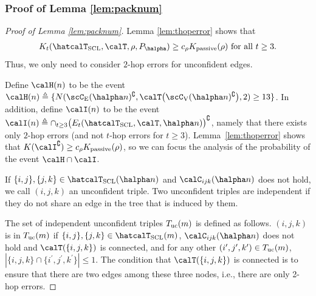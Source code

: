 \documentclass[11pt,onecolumn]{article}
\newcommand{\Passive}{{\rm passive}}
\begin{document}
\subsubsection{Proof of Lemma \ref{lem:packnum}}
\begin{proof}[Proof of Lemma \ref{lem:packnum}]
    Lemma \ref{lem:thoperror} shows that 
    \begin{align}
    	K _{t}(\hatcalT_{{\rm SCL}},\calT,\rho,P_{\halpha})\geq c_{\rho}K _{\Passive}(\rho) \text{ for all }t\geq 3.
    \end{align}
    Thus, we only need to consider  $2$-hop errors for unconfident edges.

	Define $\calH(n)$ to be the event $\calH(n)\triangleq \{N(\scC_{\mathrm{E}}(\halpha n)^{\complement},\calT\big(\scC_{\mathrm{V}}(\halpha n)^{\complement}\big),2)\geq 13\}$. In addition, define $\calI(n)$ to be the event $\calI(n)\triangleq\cap_{t\geq 3}\big(E_{t}(\hatcalT_{{\rm SCL}},\calT,\halpha n)\big)^{\complement}$, namely that there  exists only $2$-hop errors (and not $t$-hop errors for $t\ge 3$). 
	Lemma~\ref{lem:thoperror} shows that $K (\calI^{\complement})\geq c_{\rho}K _{\Passive}(\rho)$, so we can focus the analysis  of the probability of the event $\calH\cap \calI$. 
	
	If $\{i,j\},\{j,k\}\in \hatcalT_{{\rm SCL}}(\halpha n)$ and $\calC_{ijk}(\halpha n)$ does not hold, we call $(i,j,k)$ an unconfident triple. Two unconfident triples are independent if they do not  share an edge in the tree that is induced by them. %
	
	The set of independent unconfident triples $T_{{\rm uc}}(m)$ is defined as follows. $(i,j,k)$ is in $T_{{\rm uc}}(m)$ if $\{i,j\},\{j,k\}\in \hatcalT_{{\rm SCL}}(m)$, $\calC_{ijk}(\halpha n)$ does not hold and $\calT(\{i,j,k\})$ is connected, and for any other
	$(i^{\prime},j^{\prime},k^{\prime}) \in T_{{\rm uc}}(m)$, $|\{i,j,k\}\cap\{i^{\prime},j^{\prime},k^{\prime}\}|\leq 1$. The condition that $\calT(\{i,j,k\})$ is connected is to ensure that there are two edges among these three nodes, i.e., there 
	are only 2-hop errors.
	

\end{proof}
\end{document}
